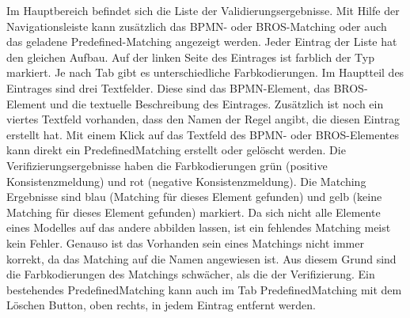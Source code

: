 Im Hauptbereich befindet sich die Liste der Validierungsergebnisse.
Mit Hilfe der Navigationsleiste kann zusätzlich das BPMN- oder BROS-Matching oder auch das geladene Predefined-Matching angezeigt werden.
Jeder Eintrag der Liste hat den gleichen Aufbau.
Auf der linken Seite des Eintrages ist farblich der Typ markiert. Je nach Tab gibt es unterschiedliche Farbkodierungen.
Im Hauptteil des Eintrages sind drei Textfelder.
Diese sind das BPMN-Element, das BROS-Element und die textuelle Beschreibung des Eintrages.
Zusätzlich ist noch ein viertes Textfeld vorhanden, dass den Namen der Regel angibt, die diesen Eintrag erstellt hat.
Mit einem Klick auf das Textfeld des BPMN- oder BROS-Elementes kann direkt ein PredefinedMatching erstellt oder gelöscht werden.
Die Verifizierungsergebnisse haben die Farbkodierungen grün (positive Konsistenzmeldung) und rot (negative Konsistenzmeldung).
Die Matching Ergebnisse sind blau (Matching für dieses Element gefunden) und gelb (keine Matching für dieses Element gefunden) markiert.
Da sich nicht alle Elemente eines Modelles auf das andere abbilden lassen, ist ein fehlendes Matching meist kein Fehler.
Genauso ist das Vorhanden sein eines Matchings nicht immer korrekt, da das Matching auf die Namen angewiesen ist. 
Aus diesem Grund sind die Farbkodierungen des Matchings schwächer, als die der Verifizierung.
Ein bestehendes PredefinedMatching kann auch im Tab PredefinedMatching mit dem Löschen Button, oben rechts, in jedem Eintrag entfernt werden.
